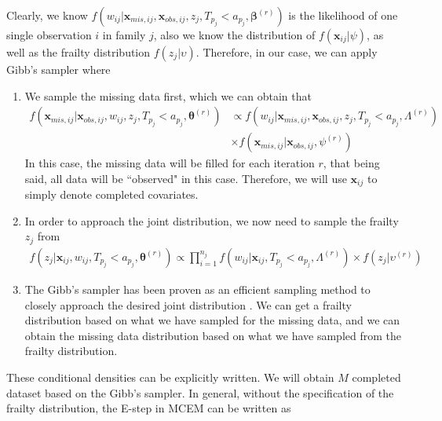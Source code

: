 \documentclass[preprint,12pt]{elsarticle}
\begin{document}
Clearly, we know $f(w_{ij}|\mathbf{x}_{mis,ij}, \mathbf{x}_{obs,ij}, z_j, T_{p_j}<a_{p_j}, \boldsymbol{\beta}^{(r)})$ is the likelihood of one single observation $i$ in family $j$, also we know the distribution of $f(\mathbf{x}_{ij}|\psi)$, as well as the frailty distribution $f(z_j|\upsilon)$. 
Therefore, in our case, we can apply Gibb's sampler where 

\begin{enumerate} 
    \item We sample the missing data first, which we can obtain that 
    \begin{align} 
        f(\mathbf{x}_{mis,ij}|\mathbf{x}_{obs,ij}, w_{ij}, z_j, T_{p_j}<a_{p_j}, \boldsymbol{\theta}^{(r)})&\propto f(w_{ij}|\mathbf{x}_{mis,ij}, \mathbf{x}_{obs,ij}, z_j, T_{p_j}<a_{p_j}, \Lambda^{(r)})\\
        &\times f(\mathbf{x}_{mis,ij}|\mathbf{x}_{obs,ij},\psi^{(r)})
    \end{align}
    In this case, the missing data will be filled for each iteration $r$, that being said, all data will be ``observed" in this case. 
    Therefore, we will use $\mathbf{x}_{ij}$ to simply denote completed covariates. 
    \item In order to approach the joint distribution, we now need to sample the frailty $z_j$ from 
    \begin{align} 
        f(z_j|\mathbf{x}_{ij}, w_{ij}, T_{p_j}<a_{p_j}, \boldsymbol{\theta}^{(r)})\propto \prod_{i=1}^{n_j}f(w_{ij}|\mathbf{x}_{ij}, T_{p_j}<a_{p_j}, \Lambda^{(r)})\times f(z_j|\upsilon^{(r)})
    \end{align}
    \item The Gibb's sampler has been proven as an efficient sampling method to closely approach the desired joint distribution \cite{gelfand1990sampling}. 
    We can get a frailty distribution based on what we have sampled for the missing data, and we can obtain the missing data distribution based on what we have sampled from the frailty distribution. 
\end{enumerate}
These conditional densities can be explicitly written.
We will obtain $M$ completed dataset based on the Gibb's sampler. 
In general, without the specification of the frailty distribution, the E-step in MCEM can be written as 
\end{document}
